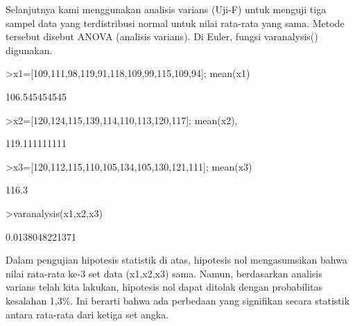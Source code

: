 \documentclass[a4paper,10pt]{article}
\begin{document}
\begin{eulernotebook}
\begin{eulercomment}
\begin{eulercomment}
\begin{eulercomment}
\begin{eulercomment}
\begin{eulercomment}
\begin{eulercomment}
\begin{eulercomment}
\begin{eulercomment}
\begin{eulercomment}
\begin{eulercomment}
\begin{eulercomment}
\begin{eulercomment}
\begin{eulercomment}
\begin{eulercomment}
\begin{eulercomment}
\begin{eulercomment}
\begin{eulercomment}
\begin{eulercomment}
\begin{eulercomment}
\begin{eulercomment}
\begin{eulercomment}
Selanjutnya kami menggunakan analisis varians (Uji-F) untuk menguji
tiga sampel data yang terdistribusi normal untuk nilai rata-rata yang
sama. Metode tersebut disebut ANOVA (analisis varians). Di Euler,
fungsi varanalysis() digunakan.
\end{eulercomment}
\begin{eulerprompt}
>x1=[109,111,98,119,91,118,109,99,115,109,94]; mean(x1)
\end{eulerprompt}
\begin{euleroutput}
  106.545454545
\end{euleroutput}
\begin{eulerprompt}
>x2=[120,124,115,139,114,110,113,120,117]; mean(x2),
\end{eulerprompt}
\begin{euleroutput}
  119.111111111
\end{euleroutput}
\begin{eulerprompt}
>x3=[120,112,115,110,105,134,105,130,121,111]; mean(x3)
\end{eulerprompt}
\begin{euleroutput}
  116.3
\end{euleroutput}
\begin{eulerprompt}
>varanalysis(x1,x2,x3)
\end{eulerprompt}
\begin{euleroutput}
  0.0138048221371
\end{euleroutput}
\begin{eulercomment}
Dalam pengujian hipotesis statistik di atas, hipotesis nol
mengasumsikan bahwa nilai rata-rata ke-3 set data (x1,x2,x3) sama.
Namun, berdasarkan analisis varians telah kita lakukan, hipotesis nol
dapat ditolak dengan probabilitas kesalahan 1,3\%. Ini berarti bahwa
ada perbedaan yang signifikan secara statistik antara rata-rata dari
ketiga set angka.
\end{eulercomment}
\begin{eulercomment}


\end{eulercomment}
\end{eulercomment}
\end{eulercomment}
\end{eulercomment}
\end{eulercomment}
\end{eulercomment}
\end{eulercomment}
\end{eulercomment}
\end{eulercomment}
\end{eulercomment}
\end{eulercomment}
\end{eulercomment}
\end{eulercomment}
\end{eulercomment}
\end{eulercomment}
\end{eulercomment}
\end{eulercomment}
\end{eulercomment}
\end{eulercomment}
\end{eulercomment}
\end{eulercomment}
\end{eulernotebook}
\end{document}
